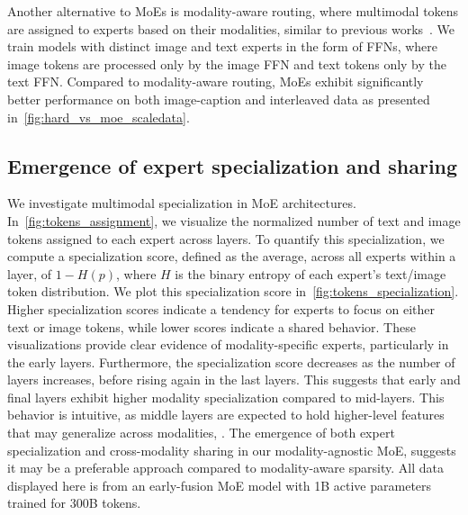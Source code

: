 Another alternative to MoEs is modality-aware routing, where multimodal tokens are assigned to experts based on their modalities, similar
to previous works~\citep{bao2021vlmo,wang2022image}. We train models with
distinct image and text experts in the form of FFNs, where image tokens are
processed only by the image FFN and text tokens only by the text FFN. Compared to modality-aware routing, MoEs exhibit significantly better performance on both image-caption and interleaved data as presented in~\cref{fig:hard_vs_moe_scaledata}.


\begin{figure}[t!]
    \begin{minipage}[t]{0.58\textwidth}
                    
    \end{minipage}
    \hfill
    \begin{minipage}[t]{0.38\textwidth}
        
    \end{minipage}
\end{figure}


\subsection{Emergence of expert specialization and sharing}
\label{sec:specialization}
We investigate multimodal specialization in MoE architectures. In~\cref{fig:tokens_assignment}, we visualize the normalized number of text and image tokens assigned to each expert across layers.  To quantify this specialization, we compute a specialization score, defined as the average, across all experts within a layer, of $1-H(p)$, where $H$ is the binary entropy of each expert's text/image token distribution. We plot this specialization score in~\cref{fig:tokens_specialization}.  Higher specialization scores indicate a tendency for experts to focus on either text or image tokens, while lower scores indicate a shared behavior.  These visualizations provide clear evidence of modality-specific experts, particularly in the early layers. Furthermore, the specialization score decreases as the number of layers increases, before rising again in the last layers. This suggests that early and final layers exhibit higher modality specialization compared to mid-layers. This behavior is intuitive, as middle layers are expected to hold higher-level features that may generalize across modalities, . The emergence of both expert specialization and cross-modality sharing in our modality-agnostic MoE, suggests it may be a preferable approach compared to modality-aware sparsity. All data displayed here is from an early-fusion MoE model with 1B active parameters trained for 300B tokens. 





